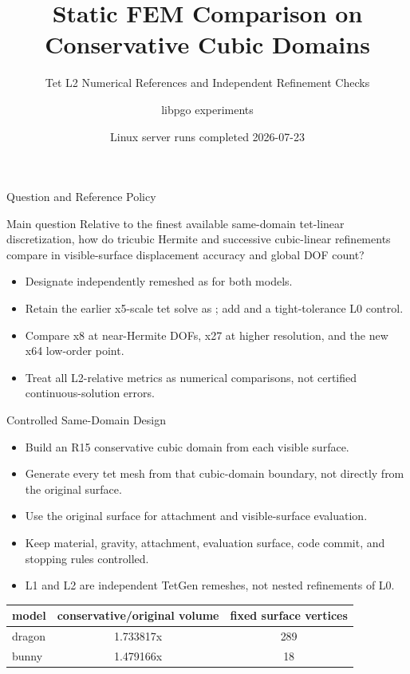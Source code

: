 \documentclass[aspectratio=169,10pt]{beamer}
\title[Dragon and Bunny Static FEM]{Static FEM Comparison on Conservative Cubic Domains}
\subtitle{Tet L2 Numerical References and Independent Refinement Checks}
\author{libpgo experiments}
\date{Linux server runs completed 2026-07-23}
\newcommand{\case}[1]{\texttt{\detokenize{#1}}}
\begin{document}
\begin{frame}
  \titlepage
\end{frame}

\begin{frame}{Question and Reference Policy}
  \begin{block}{Main question}
    Relative to the finest available same-domain tet-linear discretization,
    how do tricubic Hermite and successive cubic-linear refinements compare in
    visible-surface displacement accuracy and global DOF count?
  \end{block}

  \vspace{0.5em}
  \begin{itemize}
    \item Designate independently remeshed \case{tet_L2} as \case{tet_ref} for both models.
    \item Retain the earlier x5-scale tet solve as \case{tet_L0}; add \case{tet_L1} and a tight-tolerance L0 control.
    \item Compare x8 at near-Hermite DOFs, x27 at higher resolution, and the new x64 low-order point.
    \item Treat all L2-relative metrics as numerical comparisons, not certified continuous-solution errors.
  \end{itemize}
\end{frame}

\begin{frame}{Controlled Same-Domain Design}
  \small
  \begin{itemize}
    \item Build an R15 conservative cubic domain from each visible surface.
    \item Generate every tet mesh from that cubic-domain boundary, not directly from the original surface.
    \item Use the original surface for attachment and visible-surface evaluation.
    \item Keep material, gravity, attachment, evaluation surface, code commit, and stopping rules controlled.
    \item L1 and L2 are independent TetGen remeshes, not nested refinements of L0.
  \end{itemize}

  \vspace{0.5em}
  \begin{table}
    \centering
    \begin{tabular}{lcc}
      \toprule
      model & conservative/original volume & fixed surface vertices \\
      \midrule
      dragon & 1.733817x & 289 \\
      bunny & 1.479166x & 18 \\
      \bottomrule
    \end{tabular}
  \end{table}
\end{frame}
\end{document}
